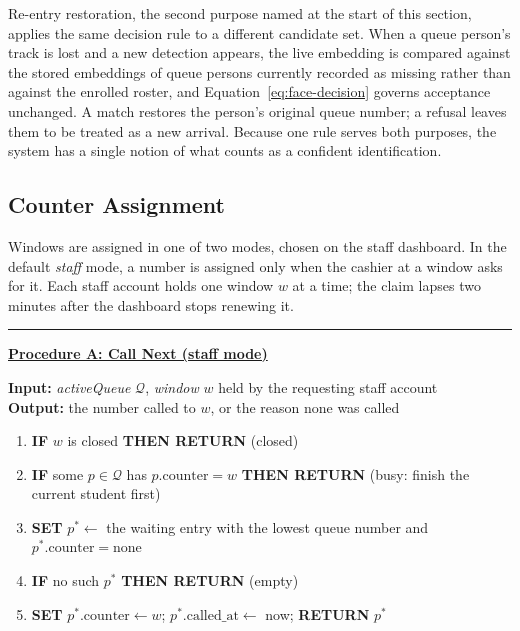 Re-entry restoration, the second purpose named at the start of this
section, applies the same decision rule to a different candidate set. When
a queue person's track is lost and a new detection appears, the live
embedding is compared against the stored embeddings of queue persons
currently recorded as missing rather than against the enrolled roster, and
Equation~\ref{eq:face-decision} governs acceptance unchanged. A match
restores the person's original queue number; a refusal leaves them to be
treated as a new arrival. Because one rule serves both purposes, the
system has a single notion of what counts as a confident identification.

\subsection{Counter Assignment}
\label{subsec:counters}

Windows are assigned in one of two modes, chosen on the staff dashboard.
In the default \emph{staff} mode, a number is assigned only when the
cashier at a window asks for it. Each staff account holds one window
$w$ at a time; the claim lapses two minutes after the dashboard stops
renewing it.

\vspace{0.5em}
\noindent\rule{\linewidth}{0.8pt}

\noindent\textbf{\underline{Procedure A: Call Next (staff mode)}}

\noindent\textbf{Input:} \textit{activeQueue} $\mathcal{Q}$,
\textit{window} $w$ held by the requesting staff account\\
\noindent\textbf{Output:} the number called to $w$, or the reason none
was called

\begin{enumerate}
  \item \textbf{IF} $w$ is closed \textbf{THEN RETURN} (closed)
  \item \textbf{IF} some $p \in \mathcal{Q}$ has
        $p.\text{counter} = w$ \textbf{THEN RETURN} (busy: finish the
        current student first)
  \item \textbf{SET} $p^{*} \gets$ the waiting entry with the lowest
        queue number and $p^{*}.\text{counter} = \text{none}$
  \item \textbf{IF} no such $p^{*}$ \textbf{THEN RETURN} (empty)
  \item \textbf{SET} $p^{*}.\text{counter} \gets w$;
        $p^{*}.\text{called\_at} \gets$ now; \textbf{RETURN} $p^{*}$
\end{enumerate}
\vspace{0.3em}

